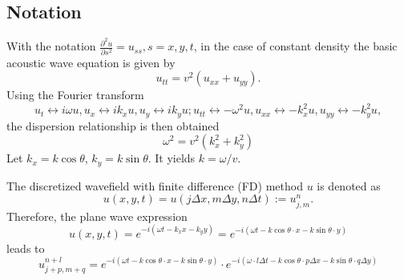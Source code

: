 \subsection{Notation}
With the notation $\frac{\partial^2 u}{\partial s^2}=u_{ss}, s=x,y,t$, in the case of constant density the basic acoustic wave equation is given by
\begin{equation}
 u_{tt}=v^2(u_{xx}+u_{yy}).
\end{equation}
Using the Fourier transform
\begin{equation}
u_t\leftrightarrow i\omega u, u_x\leftrightarrow i k_x u, u_y\leftrightarrow i k_y u;
u_{tt}\leftrightarrow -\omega^2 u,
u_{xx}\leftrightarrow -k_x^2 u,
u_{yy}\leftrightarrow-k_y^2 u,
\end{equation}
the dispersion relationship is then obtained
\begin{equation}
 \omega^2=v^2 (k_x^2+k_y^2)
\end{equation}
Let $k_x=k\cos\theta$, $k_y=k\sin\theta$. It yields  $k=\omega/v$.

The discretized wavefield with finite difference (FD) method $u$ is denoted as
\begin{equation}
 u(x,y,t)=u(j\Delta x, m\Delta y, n\Delta t):=u_{j,m}^n.
\end{equation}
Therefore, the plane wave expression
\begin{equation}
u(x,y,t)=e^{-i(\omega t- k_x x- k_y y)}=e^{-i(\omega t -k\cos\theta\cdot x-k\sin\theta\cdot y)}
\end{equation}
leads to
\begin{equation}
 u_{j+p,m+q}^{n+l}=e^{-i(\omega t -k\cos\theta\cdot x-k\sin\theta\cdot y)} \cdot
 e^{-i(\omega \cdot l\Delta t -k\cos\theta \cdot p\Delta x-k\sin\theta \cdot q\Delta y)}
\end{equation}

